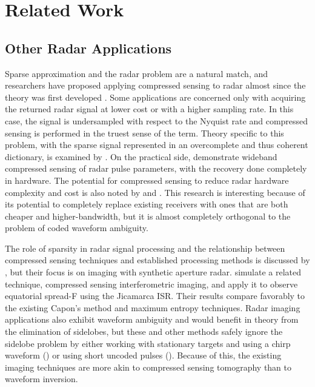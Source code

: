 \section{Related Work}
\label{related_work}
\subsection{Other Radar Applications}
Sparse approximation and the radar problem are a natural match, and researchers have proposed applying compressed sensing to radar almost since the theory was first developed \autocite{BS07}. Some applications are concerned only with acquiring the returned radar signal at lower cost or with a higher sampling rate. In this case, the signal is undersampled with respect to the Nyquist rate and compressed sensing is performed in the truest sense of the term. Theory specific to this problem, with the sparse signal represented in an overcomplete and thus coherent dictionary, is examined by \textcite{CENR11}. On the practical side, \textcite{YTN+12} demonstrate wideband compressed sensing of radar pulse parameters, with the recovery done completely in hardware. The potential for compressed sensing to reduce radar hardware complexity and cost is also noted by \textcite{BS07} and \textcite{End10}. This research is interesting because of its potential to completely replace existing receivers with ones that are both cheaper and higher-bandwidth, but it is almost completely orthogonal to the problem of coded waveform ambiguity.

The role of sparsity in radar signal processing and the relationship between compressed sensing techniques and established processing methods is discussed by \textcite{PEPC10}, but their focus is on imaging with synthetic aperture radar. \textcite{HM13} simulate a related technique, compressed sensing interferometric imaging, and apply it to observe equatorial spread-F using the Jicamarca ISR. Their results compare favorably to the existing Capon's method and maximum entropy techniques. Radar imaging applications also exhibit waveform ambiguity and would benefit in theory from the elimination of sidelobes, but these and other methods safely ignore the sidelobe problem by either working with stationary targets and using a chirp waveform (\autocite{PEPC10}) or using short uncoded pulses (\autocite{HM13}). Because of this, the existing imaging techniques are more akin to compressed sensing tomography than to waveform inversion.

